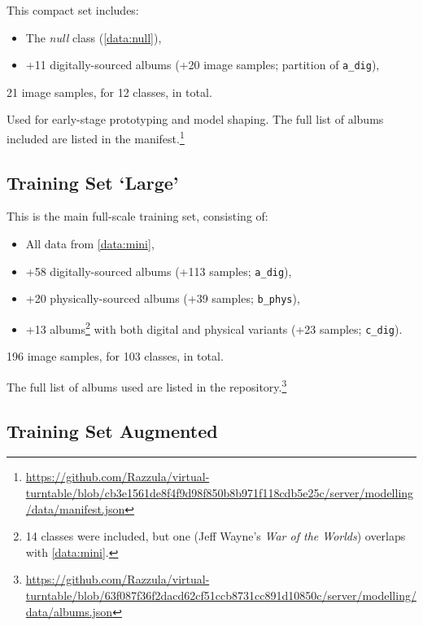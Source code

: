 \begin{uomappendix}
                This compact set includes:
                \begin{itemize}
                    \item The \textit{null} class (\ref{data:null}),
                    \item +11 digitally-sourced albums (+20 image samples; partition of \texttt{a\_dig}),
                \end{itemize}
    
                21 image samples, for 12 classes, in total.
    
                Used for early-stage prototyping and model shaping. The full list of albums included are listed in the manifest.\footnote{\url{https://github.com/Razzula/virtual-turntable/blob/cb3e1561de8f4f9d98f850b8b971f118cdb5e25c/server/modelling/data/manifest.json}}
    
            \subsection{Training Set `Large'} \label{data:large}
    
                This is the main full-scale training set, consisting of:
                \begin{itemize}
                    \item All data from \ref{data:mini},
                    \item +58 digitally-sourced albums (+113 samples; \texttt{a\_dig}),
                    \item +20 physically-sourced albums (+39 samples; \texttt{b\_phys}),
                    \item +13 albums\footnote{14 classes were included, but one (Jeff Wayne’s \textit{War of the Worlds}) overlaps with \ref{data:mini}.} with both digital and physical variants (+23 samples; \texttt{c\_dig}).
                \end{itemize}
    
                196 image samples, for 103 classes, in total.
                
                The full list of albums used are listed in the repository.\footnote{\url{https://github.com/Razzula/virtual-turntable/blob/63f087f36f2dacd62cf51ccb8731cc891d10850c/server/modelling/data/albums.json}}
    
            \subsection{Training Set Augmented} \label{data:aug}
    

\end{uomappendix}
